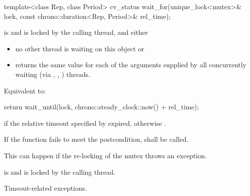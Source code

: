 
%
\begin{itemdecl}
template<class Rep, class Period>
  cv_status wait_for(unique_lock<mutex>& lock,
                     const chrono::duration<Rep, Period>& rel_time);
\end{itemdecl}
\begin{itemdescr}
 \pnum \requires {} is  and 
        is locked by the calling thread, and either
        \begin{itemize}
         \item no other thread is waiting on this  object or
         \item {} returns the same value for each of the  arguments
                supplied by all concurrently waiting (via ,
                , ) threads.
        \end{itemize}

 \pnum \effects Equivalent to:
\begin{codeblock}
return wait_until(lock, chrono::steady_clock::now() + rel_time);
\end{codeblock}

 \pnum \returns {} if
                the relative timeout specified by  expired,
                otherwise .

 \pnum \remarks
                If the function fails to meet the postcondition, 
                shall be called.
                \begin{note} This can happen if the re-locking of the mutex throws an exception. \end{note}

 \pnum \postconditions {} is  and 
        is locked by the calling thread.

 \pnum \throws Timeout-related exceptions.
\end{itemdescr}


